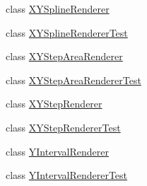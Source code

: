\begin{DoxyCompactItemize}
\item 
class \mbox{\hyperlink{classorg_1_1jfree_1_1chart_1_1renderer_1_1xy_1_1_x_y_spline_renderer}{X\+Y\+Spline\+Renderer}}
\item 
class \mbox{\hyperlink{classorg_1_1jfree_1_1chart_1_1renderer_1_1xy_1_1_x_y_spline_renderer_test}{X\+Y\+Spline\+Renderer\+Test}}
\item 
class \mbox{\hyperlink{classorg_1_1jfree_1_1chart_1_1renderer_1_1xy_1_1_x_y_step_area_renderer}{X\+Y\+Step\+Area\+Renderer}}
\item 
class \mbox{\hyperlink{classorg_1_1jfree_1_1chart_1_1renderer_1_1xy_1_1_x_y_step_area_renderer_test}{X\+Y\+Step\+Area\+Renderer\+Test}}
\item 
class \mbox{\hyperlink{classorg_1_1jfree_1_1chart_1_1renderer_1_1xy_1_1_x_y_step_renderer}{X\+Y\+Step\+Renderer}}
\item 
class \mbox{\hyperlink{classorg_1_1jfree_1_1chart_1_1renderer_1_1xy_1_1_x_y_step_renderer_test}{X\+Y\+Step\+Renderer\+Test}}
\item 
class \mbox{\hyperlink{classorg_1_1jfree_1_1chart_1_1renderer_1_1xy_1_1_y_interval_renderer}{Y\+Interval\+Renderer}}
\item 
class \mbox{\hyperlink{classorg_1_1jfree_1_1chart_1_1renderer_1_1xy_1_1_y_interval_renderer_test}{Y\+Interval\+Renderer\+Test}}
\end{DoxyCompactItemize}
